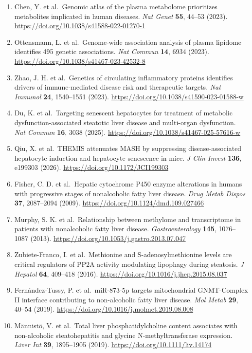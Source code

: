 \begin{enumerate}
\item
  Chen, Y. et al.~Genomic atlas of the plasma metabolome prioritizes metabolites implicated in human diseases. \emph{Nat Genet} \textbf{55}, 44--53 (2023). \url{https://doi.org/10.1038/s41588-022-01270-1}
\item
  Ottensmann, L. et al.~Genome-wide association analysis of plasma lipidome identifies 495 genetic associations. \emph{Nat Commun} \textbf{14}, 6934 (2023). \url{https://doi.org/10.1038/s41467-023-42532-8}
\item
  Zhao, J. H. et al.~Genetics of circulating inflammatory proteins identifies drivers of immune-mediated disease risk and therapeutic targets. \emph{Nat Immunol} \textbf{24}, 1540--1551 (2023). \url{https://doi.org/10.1038/s41590-023-01588-w}
\item
  Du, K. et al.~Targeting senescent hepatocytes for treatment of metabolic dysfunction-associated steatotic liver disease and multi-organ dysfunction. \emph{Nat Commun} \textbf{16}, 3038 (2025). \url{https://doi.org/10.1038/s41467-025-57616-w}
\item
  Qiu, X. et al.~THEMIS attenuates MASH by suppressing disease-associated hepatocyte induction and hepatocyte senescence in mice. \emph{J Clin Invest} \textbf{136}, e199303 (2026). \url{https://doi.org/10.1172/JCI199303}
\item
  Fisher, C. D. et al.~Hepatic cytochrome P450 enzyme alterations in humans with progressive stages of nonalcoholic fatty liver disease. \emph{Drug Metab Dispos} \textbf{37}, 2087--2094 (2009). \url{https://doi.org/10.1124/dmd.109.027466}
\item
  Murphy, S. K. et al.~Relationship between methylome and transcriptome in patients with nonalcoholic fatty liver disease. \emph{Gastroenterology} \textbf{145}, 1076--1087 (2013). \url{https://doi.org/10.1053/j.gastro.2013.07.047}
\item
  Zubiete-Franco, I. et al.~Methionine and S-adenosylmethionine levels are critical regulators of PP2A activity modulating lipophagy during steatosis. \emph{J Hepatol} \textbf{64}, 409--418 (2016). \url{https://doi.org/10.1016/j.jhep.2015.08.037}
\item
  Fernández-Tussy, P. et al.~miR-873-5p targets mitochondrial GNMT-Complex II interface contributing to non-alcoholic fatty liver disease. \emph{Mol Metab} \textbf{29}, 40--54 (2019). \url{https://doi.org/10.1016/j.molmet.2019.08.008}
\item
  Männistö, V. et al.~Total liver phosphatidylcholine content associates with non-alcoholic steatohepatitis and glycine N-methyltransferase expression. \emph{Liver Int} \textbf{39}, 1895--1905 (2019). \url{https://doi.org/10.1111/liv.14174}

\end{enumerate}
